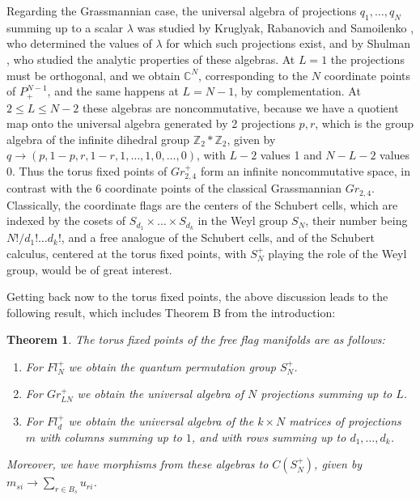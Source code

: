 \documentclass[11pt]{article}
\theoremstyle{plain}
\newtheorem{theorem}{Theorem}[section]
\begin{document}
Regarding the Grassmannian case, the universal algebra of projections $q_1,\ldots,q_N$ summing up to a scalar $\lambda$ was studied by Kruglyak, Rabanovich and Samoilenko \cite{krs}, who determined the values of $\lambda$ for which such projections exist, and by Shulman \cite{shu}, who studied the analytic properties of these algebras. At $L=1$ the projections must be orthogonal, and we obtain $\mathbb C^N$, corresponding to the $N$ coordinate points of $P^{N-1}_+$, and the same happens at $L=N-1$, by complementation. At $2\leq L\leq N-2$ these algebras are noncommutative, because we have a quotient map onto the universal algebra generated by 2 projections $p,r$, which is the group algebra of the infinite dihedral group $\mathbb Z_2*\mathbb Z_2$, given by $q\to(p,1-p,r,1-r,1,\ldots,1,0,\ldots,0)$, with $L-2$ values 1 and $N-L-2$ values 0. Thus the torus fixed points of $Gr^+_{2,4}$ form an infinite noncommutative space, in contrast with the 6 coordinate points of the classical Grassmannian $Gr_{2,4}$. Classically, the coordinate flags are the centers of the Schubert cells, which are indexed by the cosets of $S_{d_1}\times\ldots\times S_{d_k}$ in the Weyl group $S_N$, their number being $N!/d_1!\ldots d_k!$, and a free analogue of the Schubert cells, and of the Schubert calculus, centered at the torus fixed points, with $S_N^+$ playing the role of the Weyl group, would be of great interest.

\bigskip

Getting back now to the torus fixed points, the above discussion leads to the following result, which includes Theorem B from the introduction:

\begin{theorem}
\label{thm:fixed}
The torus fixed points of the free flag manifolds are as follows:
\begin{enumerate}
\item For $Fl^+_N$ we obtain the quantum permutation group $S_N^+$.

\item For $Gr^+_{LN}$ we obtain the universal algebra of $N$ projections summing up to $L$.

\item For $Fl^+_d$ we obtain the universal algebra of the $k\times N$ matrices of projections $m$ with columns summing up to $1$, and with rows summing up to $d_1,\ldots,d_k$.
\end{enumerate}
Moreover, we have morphisms from these algebras to $C(S_N^+)$, given by $m_{si}\to\sum_{r\in B_s}u_{ri}$.
\end{theorem}
\end{document}
